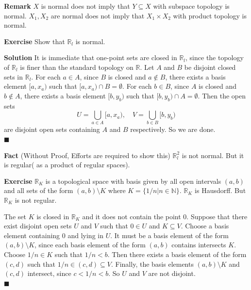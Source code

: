 \documentclass[main.tex]{subfiles}
\begin{document}
\par \noindent \textbf{Remark} $X$ is normal does not imply that $Y \subseteq X$ with subspace topology is normal. $X_1, X_2$ are normal does not imply that $X_1 \times X_2$ with product topology is normal. 

\par \noindent \textbf{Exercise} Show that $\mathbb{R}_l$ is normal. 
\par \noindent \textbf{Solution} It is immediate that one-point sets are closed in $\mathbb{R}_l$, since the topology of $\mathbb{R}_l$ is finer than the standard topology on $\mathbb{R}$. Let $A$ and $B$ be disjoint closed sets in $\mathbb{R}_l$. For each $a \in A$, since $B$ is closed and $a \notin B$, there exists a basis element $[a, x_a)$ such that $[a, x_a) \cap B = \emptyset$. For each $b \in B$, since $A$ is closed and $b \notin A$, there exists a basis element $[b, y_b)$ such that $[b, y_b) \cap A = \emptyset$. Then the open sets 
\begin{equation}
    U = \bigcup_{a \in A} [a, x_a), \quad V = \bigcup_{b \in B} [b, y_b)
\end{equation}
are disjoint open sets containing $A$ and $B$ respectively. So we are done. 
\mbox{} \\ \null \hfill $\blacksquare$ 
\par \noindent \textbf{Fact} (Without Proof, Efforts are required to show this) $\mathbb{R}_l^2$ is not normal. But it is regular( as a product of regular spaces). 
\par \noindent \textbf{Exercise} $\mathbb{R}_K$ is a topological space with basis given by all open intervals $(a, b)$ and all sets of the form $(a, b) \setminus K$ where $K = \{1/n | n \in \mathbb{N}\}$. $\mathbb{R}_K$ is Hausdorff. But $\mathbb{R}_K$ is not regular. 
\par The set $K$ is closed in $\mathbb{R}_K$ and it does not contain the point $0$. Suppose that there exist disjoint open sets $U$ and $V$ such that $0\in U$ and $K \subseteq V$. Choose a basis element containing $0$ and lying in $U$. It must be a basis element of the form $(a, b) \setminus K$, since each basis element of the form $(a, b)$ contains intersects $K$. Choose $1/n \in K$ such that $1/n < b$. Then there exists a basis element of the form $(c, d)$ such that $1/n \in (c, d) \subseteq V$. Finally, the basis elements $(a, b) \setminus K$ and $(c, d)$ intersect, since $c < 1/n < b$. So $U$ and $V$ are not disjoint. 
\mbox{} \\ \null \hfill $\blacksquare$   
\end{document}
